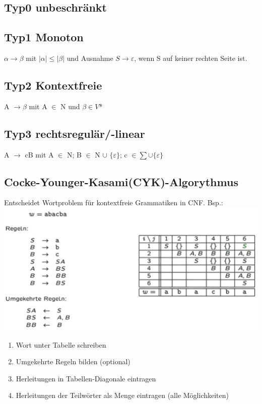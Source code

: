 \documentclass[12pt,a4paper]{article}
\begin{document}
	\subsection{Typ0 unbeschränkt}
    \subsection{Typ1 Monoton}
    $\alpha \rightarrow \beta$ mit $| \alpha | \leq  | \beta |$ und Ausnahme $S \rightarrow \varepsilon$, wenn S auf keiner rechten Seite ist.
    \subsection{Typ2 Kontextfreie}
	A $\rightarrow \beta$ mit A $\in$ N und $\beta \in V$* 
    \subsection{Typ3 rechtsregulär/-linear}
	A $\rightarrow$ cB mit A $\in$ N; B $\in$ N $\cup$ $\{ \varepsilon \}$; c $\in \sum \cup \{ \varepsilon \}$
	\subsection{Cocke-Younger-Kasami(CYK)-Algorythmus}
	Entscheidet Wortproblem für kontextfreie Grammatiken in CNF. Bsp.:\\
	\includegraphics[scale=0.3]{Bilder/cyk-Algo.png}
	\begin{enumerate}
		\item Wort unter Tabelle schreiben 
		\item Umgekehrte Regeln bilden (optional)
		\item Herleitungen in Tabellen-Diagonale eintragen
		\item Herleitungen der Teilwörter als Menge eintragen (alle Möglichkeiten)
	\end{enumerate}
\end{document}
